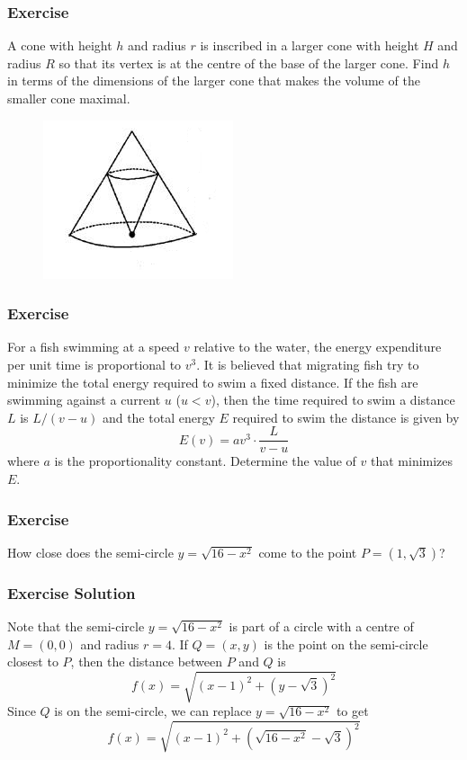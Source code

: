 \documentclass[xcolor=dvipsnames]{beamer}
\begin{document}
\begin{frame}
  \frametitle{Exercise}
  {\ubung} A cone with height $h$ and radius $r$ is inscribed in a
  larger cone with height $H$ and radius $R$ so that its vertex is at
  the centre of the base of the larger cone. Find $h$ in terms of the
  dimensions of the larger cone that makes the volume of the smaller
  cone maximal.
\begin{figure}[h]
\includegraphics[scale=.75]{./diagrams/coneopt.png}
\end{figure}
\end{frame}

\begin{frame}
  \frametitle{Exercise}
  {\ubung} For a fish swimming at a speed $v$ relative to the water,
  the energy expenditure per unit time is proportional to $v^{3}$. It
  is believed that migrating fish try to minimize the total energy
  required to swim a fixed distance. If the fish are swimming against
  a current $u$ ($u<v$), then the time required to swim a distance $L$
  is $L/(v-u)$ and the total energy $E$ required to swim the distance
  is given by
  \begin{equation}
    \label{eq:aiyeiyoo}
    E(v)=av^{3}\cdot\frac{L}{v-u}
  \end{equation}
  where $a$ is the proportionality constant. Determine the value of
  $v$ that minimizes $E$.
\end{frame}

\begin{frame}
  \frametitle{Exercise}
  {\ubung} How close does the semi-circle $y=\sqrt{16-x^{2}}$ come to
  the point $P=(1,\sqrt{3})$?
\end{frame}

\begin{frame}
  \frametitle{Exercise Solution}
  Note that the semi-circle $y=\sqrt{16-x^{2}}$ is part of a circle
  with a centre of $M=(0,0)$ and radius $r=4$. If $Q=(x,y)$ is the
  point on the semi-circle closest to $P$, then the distance between
  $P$ and $Q$ is
\begin{equation}
  \label{eq:aziobaeg}
  f(x)=\sqrt{(x-1)^{2}+(y-\sqrt{3})^{2}}
\end{equation}
Since $Q$ is on the semi-circle, we can replace $y=\sqrt{16-x^{2}}$ to
get 
\begin{equation}
  \label{eq:shahquua}
  f(x)=\sqrt{(x-1)^{2}+(\sqrt{16-x^{2}}-\sqrt{3})^{2}}
\end{equation}
\end{frame}
\end{document}
